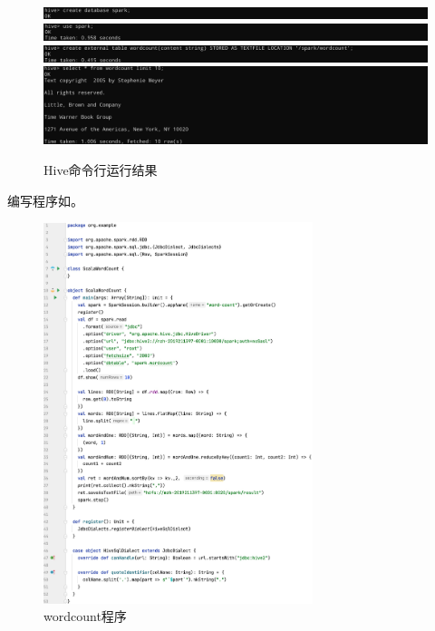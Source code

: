 \documentclass[lang=cn,11pt,a4paper,cite=authornum]{paper}
\begin{document}
\begin{figure}[!htb]
    \centering
    \includegraphics[width=\linewidth]{./images/hive1.jpg}
    \includegraphics[width=\linewidth]{./images/hive2.jpg}
    \includegraphics[width=\linewidth]{./images/hive3.jpg}
    \includegraphics[width=\linewidth]{./images/hive4.jpg}
    \caption{Hive命令行运行结果\label{fig:hive}}
\end{figure}

编写程序如。

\begin{figure}[!htb]
    \centering
    \includegraphics[width=0.7\textwidth]{./images/code2.jpg}
    \caption{wordcount程序\label{fig:code2}}
\end{figure}
\end{document}
